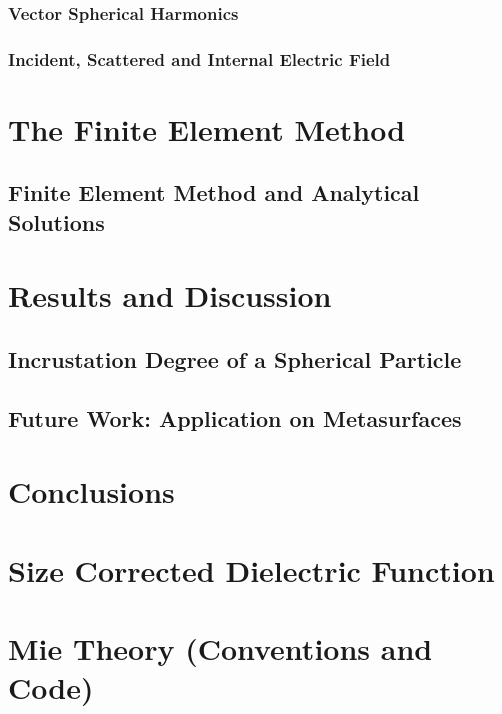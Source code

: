 \documentclass[11pt]{Latex/Classes/PhDthesisPSnPDF}
\begin{document}
	\subsection{Vector Spherical Harmonics}
		\label{ssection:VSH}		
		
	\subsection{Incident, Scattered and Internal Electric Field}
	\label{ssection:Fields}
		\label{ssection:Fields}
		

\chapter{The Finite Element Method}
\label{chapter:FEM}



	\section{Finite Element Method and Analytical Solutions}
		\label{sec:FEM-Mie}
		
		


\chapter{Results and Discussion}
	
	\section{Incrustation Degree of a Spherical Particle}
	
    \section{Future Work: Application on Metasurfaces}
    
\chapter{Conclusions}


\appendix
\chapter{Size Corrected Dielectric Function}


\chapter{Mie Theory (Conventions and Code)}

\end{document}
